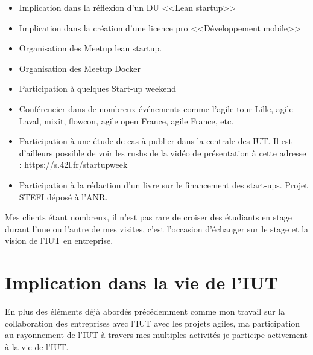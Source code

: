 \documentclass[a4paper]{article}
\begin{document}
\begin{itemize}
  \item Implication dans la réflexion d'un DU <<Lean startup>>
  \item Implication dans la création d'une licence pro <<Développement mobile>> 
  \item Organisation des Meetup lean startup.
  \item Organisation des Meetup Docker
  \item Participation à quelques Start-up weekend
  \item Conférencier dans de nombreux événements comme l'agile tour Lille, agile Laval, mixit, flowcon, agile open France, agile France, etc.
  \item Participation à une étude de cas à publier dans la centrale des IUT. Il est d'ailleurs possible de voir les rushs de la vidéo de présentation à cette adresse : https://s.42l.fr/startupweek
  \item Participation à la rédaction d'un livre sur le financement des start-ups. Projet STEFI déposé à l'ANR.
\end{itemize}

Mes clients étant nombreux, il n'est pas rare de croiser des étudiants en stage durant l'une ou l'autre de mes visites, c'est l'occasion d'échanger sur le stage et la vision de l'IUT en entreprise.

\section{Implication dans la vie de l'IUT}

En plus des éléments déjà abordés précédemment comme mon travail sur la collaboration des entreprises avec l'IUT avec les projets agiles, ma participation au rayonnement de l'IUT à travers mes multiples activités je participe activement à la vie de l'IUT.
\end{document}
